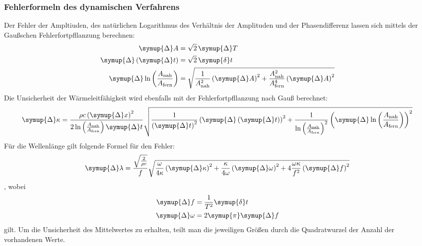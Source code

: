 \subsubsection{Fehlerformeln des dynamischen Verfahrens}
Der Fehler der Ampltiuden, des natürlichen Logarithmus des Verhältnis der Amplituden und der Phasendifferenz 
lassen sich mittels der Gaußschen Fehlerfortpfllanzung berechnen:
\begin{align}
  \symup{\Delta} A                                                      &= \sqrt{2} \, \symup{\Delta} T \\
  \symup{\Delta} \left (\symup{\Delta} t \right )                       &= \sqrt{2} \, \symup{\delta} t \\
  \symup{\Delta} \ln \left ( \frac{A_\text{nah}}{A_\text{fern}} \right) &= 
  \sqrt{\frac{1}{A_\text{nah}^2} \left ( \symup{\Delta} A \right )^2 + 
  \frac{A_\text{nah}^2}{A_\text{fern}^4} \left ( \symup{\Delta} A \right ) ^2} 
\end{align}
Die Unsicherheit der Wärmeleitfähigkeit wird ebenfalls mit der Fehlerfortpfllanzung nach Gauß berechnet:
\begin{equation} 
  \symup{\Delta} \kappa = \frac{\rho c \left ( \symup{\Delta} x \right )^2 }
  {2\ln \left ( \frac{A_\text{nah}}{A_\text{fern}} \right ) \symup{\Delta} t} 
  \sqrt{\frac{1}{\left( \symup{\Delta} t\right)^2}
  \left ( \symup{\Delta} \left ( \symup{\Delta} t \right ) \right )^2 + \frac{1}{ \ln \left ( \frac{A_\text{nah}}{A_\text{fern}} \right )^2}
 \left (  \symup{\Delta} \ln \left ( \frac{A_\text{nah}}{A_\text{fern}} \right ) \right )^2}
\end{equation}
Für die Wellenlänge gilt folgende Formel für den Fehler: 
\begin{equation}
 \symup{\Delta} \lambda =  \frac{\sqrt{\frac{2}{\rho c}}} {f} \sqrt{ \frac{\omega}{4 \kappa} \left ( \symup{\Delta} \kappa \right )^2 +
  \frac{\kappa}{4 \omega} \left( \symup{\Delta}\omega\right)^2 +
   4 \frac{\omega\kappa}{f^2} \left(\symup{\Delta} f\right)^2   }
\end{equation}
, wobei
\begin{align}
    \symup{\Delta}f &= \frac{1}{T^2} \symup{\delta} t \\
    \symup{\Delta}\omega &= 2 \symup{\pi} \symup{\Delta} f
\end{align}
gilt. Um die Unsicherheit des Mittelwertes zu erhalten, teilt man die jeweiligen Größen durch die Quadratwurzel der Anzahl der vorhandenen Werte.